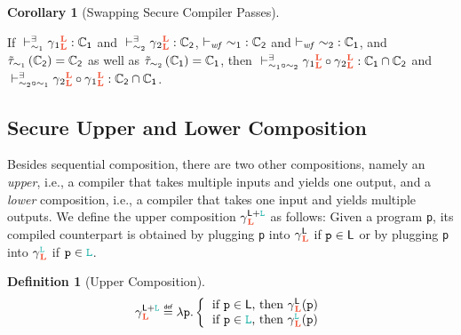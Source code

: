 \documentclass[acmsmall]{acmart}
\theoremstyle{definition}
\newtheorem{corollary}{Corollary}[section]
\newtheorem{definition}{Definition}[section]
\begin{document}
\begin{corollary}[Swapping Secure Compiler Passes]\label{corr:swappable:tau}
  $\;$ 

  If {$\rtptau{\cc[_{1}]{\trg{L}}{\trg{L}}}{\src{\class[_{1}]}}{\sim_1}$ and $\rtptau{\cc[_{2}]{\trg{L}}{\trg{L}}}{\src{\class[_{2}]}}{\sim_2}$}, %
  {$\wfctau{\sim_1}{\src{\class[_2]}}$ and $\wfctau{\sim_2}{\src{\class[_1]}}$}, %
  and {$\tilde{\tau}_{\sim_1}\left(\src{\class[_2]}\right)=\src{\class[_2]}$ as well as $\tilde{\tau}_{\sim_2}\left(\src{\class[_1]}\right)=\src{\class[_1]}$},
  then {$\rtptau{\cc[_{1}]{\trg{L}}{\trg{L}}\circ\cc[_{2}]{\trg{L}}{\trg{L}}}{\src{\class[_{1}]}\cap\src{\class[_{2}]}}{\sim_1\circ\sim_2}$ and $\rtptau{\cc[_{2}]{\trg{L}}{\trg{L}}\circ\cc[_{1}]{\trg{L}}{\trg{L}}}{\src{\class[_{2}]}\cap\src{\class[_{1}]}}{\sim_2\circ\sim_1}$}. \Coqed
\end{corollary}

\subsection{Secure Upper and Lower Composition}\label{sec:other-compos}
Besides sequential composition, there are two other compositions, namely an {\em upper}, i.e., a compiler that takes multiple inputs and yields one output, and a {\em lower} composition, i.e., a compiler that takes one input and yields multiple outputs.
We {define the upper composition $\cc{\src{L}+\obj{L}}{\trg{L}}$} as follows:
Given a program \texttt{p}, its compiled counterpart is obtained by {plugging \texttt{p} into $\cc{\src{L}}{\trg{L}}$ if $\texttt{p}\in\src{L}$} or by {plugging \texttt{p} into $\cc{\obj{L}}{\trg{L}}$ if $\texttt{p}\in\obj{L}$}.
\begin{definition}[Upper Composition]
  \[
    \text{{$\cc{\src{L}+\obj{L}}{\trg{L}}$}}\isdef
  \lambda \texttt{p}\ldotp
  \left\{\mbox{\begin{tabular}{c}
    {{if $\texttt{p}\in\src{L}$, then $\cc{\src{L}}{\trg{L}}(\texttt{p})$}} \\
    \mbox{{if $\texttt{p}\in\obj{L}$, then $\cc{\obj{L}}{\trg{L}}(\texttt{p})$}} \\
  \end{tabular}}\right. 
  \]
\end{definition}
\end{document}
